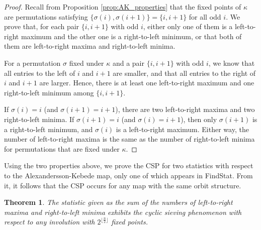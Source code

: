 \documentclass{amsart}
\newtheorem{thm}{Theorem}[section]
\theoremstyle{definition}
\begin{document}
\begin{proof}
  Recall from Proposition \ref{prop:AK_properties} that the fixed points of $\kappa$ are permutations satisfying $\{\sigma(i), \sigma(i+1)\} =\{i, i+1\}$ for all odd $i$. We prove that, for each pair $\{i, i+1\}$ with odd $i$, either only one of them is a left-to-right maximum and the other one is a right-to-left minimum, or that both of them are left-to-right maxima and right-to-left minima.

  For a permutation $\sigma$ fixed under $\kappa$ and a pair $\{i, i+1\}$ with odd $i$, we know that all entries to the left of $i$ and $i+1$ are smaller, and that all entries to the right of $i$ and $i+1$ are larger. Hence, there is at least one left-to-right maximum and one right-to-left minimum among $\{i, i+1\}$.

  If $\sigma(i) = i$ (and $\sigma(i+1) = i+1$), there are two left-to-right maxima and two right-to-left minima. If $\sigma(i+1) = i$ (and $\sigma(i) = i+1$), then only $\sigma(i+1)$ is a right-to-left minimum, and $\sigma(i)$ is a left-to-right maximum. Either way, the number of left-to-right maxima is the same as the number of right-to-left minima for permutations that are fixed under $\kappa$.
\end{proof}

Using the two properties above, we prove the CSP for two statistics with respect to the Alexandersson-Kebede map, only one of which appears in FindStat. From it, it follows that the CSP occurs for any map with the same orbit structure.


\begin{thm}\label{thm:CSP_AK}
  The statistic given as the sum of the numbers of left-to-right maxima and right-to-left minima exhibits the cyclic sieving phenomenon with respect to any involution with $2^{\lfloor\frac{n}{2}\rfloor}$ fixed points.
\end{thm}
\end{document}
